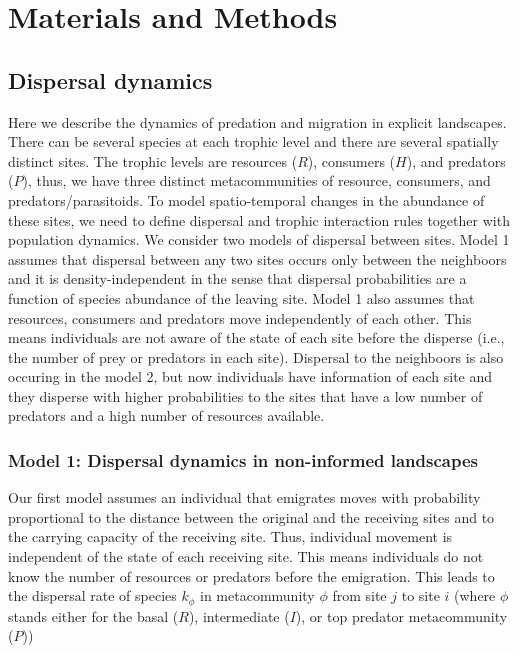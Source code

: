 \section{Materials and Methods}


\subsection{Dispersal dynamics}

Here we describe the dynamics of predation and migration in explicit
landscapes. There can be several species at each trophic level and
there are several spatially distinct sites. The trophic levels are
resources ($R$), consumers ($H$), and predators ($P$), thus, we have
three distinct metacommunities of resource, consumers, and
predators/parasitoids. To model spatio-temporal changes in the
abundance of these sites, we need to define dispersal and trophic
interaction rules together with population dynamics. We consider two
models of dispersal between sites. Model 1 assumes that dispersal
between any two sites occurs only between the neighboors and it is
density-independent in the sense that dispersal probabilities are a
function of species abundance of the leaving site. Model 1 also
assumes that resources, consumers and predators move independently of
each other. This means individuals are not aware of the state of each
site before the disperse (i.e., the number of prey or predators in
each site). Dispersal to the neighboors is also occuring in the model
2, but now individuals have information of each site and they disperse
with higher probabilities to the sites that have a low number of
predators and a high number of resources available.


\subsubsection{Model 1: Dispersal dynamics in non-informed landscapes}

Our first model assumes an individual that emigrates moves with
probability proportional to the distance between the original and the
receiving sites and to the carrying capacity of the receiving
site. Thus, individual movement is independent of the state of each
receiving site. This means individuals do not know the number of
resources or predators before the emigration. This leads to the
dispersal rate of species $k_{\mathcal{\phi}}$ in metacommunity
$\mathcal{\phi}$ from site $j$ to site $i$ (where $\mathcal{\phi}$
stands either for the basal ($R$), intermediate ($I$), or top predator
metacommunity ($P$))

